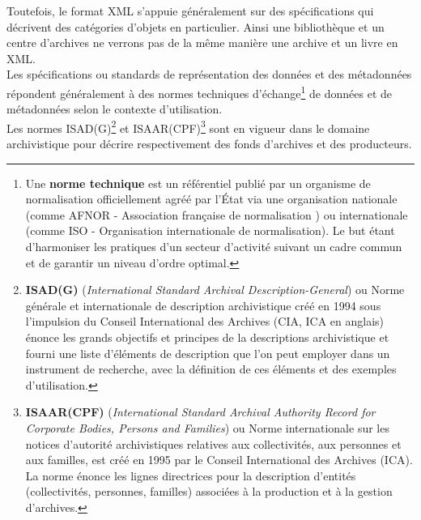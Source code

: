 Toutefois, le format XML s'appuie généralement sur des spécifications qui décrivent des catégories d'objets en particulier. Ainsi une bibliothèque et un centre d'archives ne verrons pas de la même manière une archive et un livre en XML.\\

Les spécifications ou standards de représentation des données et des métadonnées répondent généralement à des normes techniques d'échange\footnote{Une \textbf{norme technique} est un référentiel publié par un organisme de normalisation officiellement agréé par l'État via une organisation nationale (comme AFNOR - Association française de normalisation ) ou internationale (comme ISO - Organisation internationale de normalisation). Le but étant d'harmoniser les pratiques d'un secteur d'activité suivant un cadre commun et de garantir un niveau d'ordre optimal.} de données et de métadonnées selon le contexte d'utilisation.\\

Les normes ISAD(G)\footnote{\textbf{ISAD(G)} (\textit{International Standard Archival Description-General}) ou Norme générale et internationale de description archivistique créé en 1994 sous l'impulsion du Conseil International des Archives (CIA, ICA en anglais) énonce les grands objectifs et principes de la descriptions archivistique et fourni une liste d'éléments de description que l'on peut employer dans un instrument de recherche, avec la définition de ces éléments et des exemples d'utilisation.} et ISAAR(CPF)\footnote{\textbf{ISAAR(CPF)} (\textit{International Standard Archival Authority Record for Corporate Bodies, Persons and Families}) ou Norme internationale sur les notices d'autorité archivistiques relatives aux collectivités, aux personnes et aux familles, est créé en 1995 par le Conseil International des Archives (ICA). La norme énonce les lignes directrices pour la description d'entités (collectivités, personnes, familles) associées à la production et à la gestion d'archives.} sont en vigueur dans le domaine archivistique pour décrire respectivement des fonds d'archives et des producteurs.

